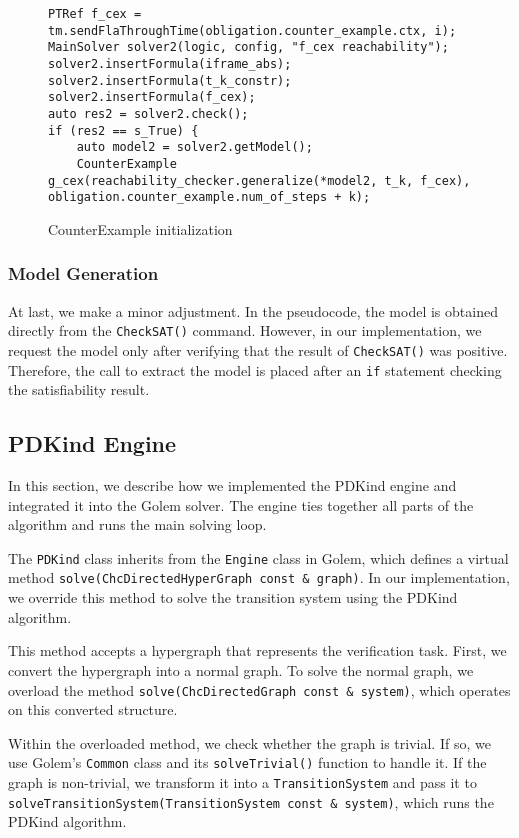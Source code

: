 \begin{figure}[H]
\begin{lstlisting}
PTRef f_cex = tm.sendFlaThroughTime(obligation.counter_example.ctx, i);
MainSolver solver2(logic, config, "f_cex reachability");
solver2.insertFormula(iframe_abs);
solver2.insertFormula(t_k_constr);
solver2.insertFormula(f_cex);
auto res2 = solver2.check();
if (res2 == s_True) {
    auto model2 = solver2.getModel();
    CounterExample g_cex(reachability_checker.generalize(*model2, t_k, f_cex), obligation.counter_example.num_of_steps + k);
\end{lstlisting}
\caption{CounterExample initialization}\label{code:CEX}
\end{figure}

\subsubsection{Model Generation}

\noindent At last, we make a minor adjustment. In the pseudocode, the model is
obtained directly from the \texttt{CheckSAT()} command. However, in our
implementation, we request the model only after verifying that the result of
\texttt{CheckSAT()} was positive. Therefore, the call to extract the model is
placed after an \texttt{if} statement checking the satisfiability result.

\subsection{PDKind Engine}
\noindent In this section, we describe how we implemented the PDKind engine and
integrated it into the Golem solver. The engine ties together all parts of the
algorithm and runs the main solving loop.

The \texttt{PDKind} class inherits from the \texttt{Engine} class in
Golem, which defines a virtual method \texttt{solve(ChcDirectedHyperGraph const
\& graph)}. In our implementation, we override this method to solve the
transition system using the PDKind algorithm.

This method accepts a hypergraph that represents the verification task. First,
we convert the hypergraph into a normal graph. To solve the normal graph, we
overload the method \texttt{solve(ChcDirectedGraph const \& system)}, which
operates on this converted structure.

Within the overloaded method, we check whether the graph is trivial. If so, we
use Golem’s \texttt{Common} class and its \texttt{solveTrivial()} function to
handle it. If the graph is non-trivial, we transform it into a
\texttt{TransitionSystem} and pass it to
\texttt{solveTransitionSystem(TransitionSystem const \& system)}, which runs
the PDKind algorithm.

